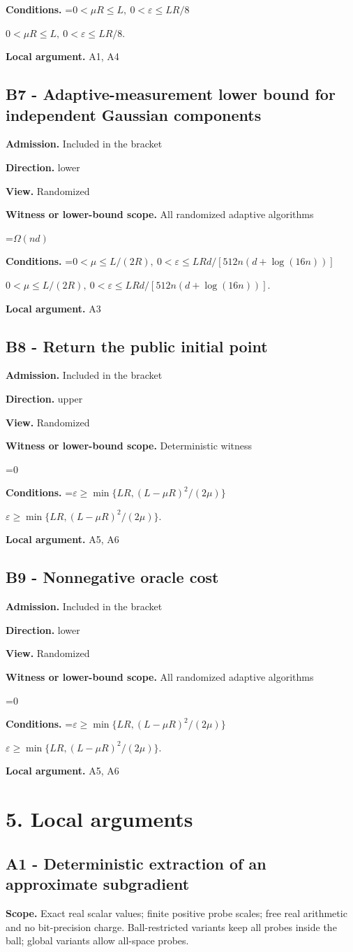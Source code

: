 \documentclass[10pt,a4paper]{article}
\newcommand{\AtlasMath}[1]{\par\begingroup\centering\setbox0=\hbox{$\displaystyle #1$}\ifdim\wd0>1.4\linewidth\typeout{ATLAS WIDE FORMULA: \the\wd0}\fi\ifdim\wd0>\linewidth\resizebox{\linewidth}{!}{\box0}\else\box0\fi\par\endgroup}
\newcommand{\AtlasInlineMath}[1]{\begingroup\setbox0=\hbox{$#1$}\ifdim\wd0>.4\linewidth\endgroup\AtlasMath{#1}\else\endgroup$#1$\fi}
\begin{document}
\textbf{Conditions.} \AtlasInlineMath{0<\mu R\le L,\ 0<\varepsilon\le LR/8}.

\textbf{Local argument.} A1, A4

\subsection{B7 - Adaptive-measurement lower bound for independent Gaussian components}
\textbf{Admission.} Included in the bracket

\textbf{Direction.} lower

\textbf{View.} Randomized

\textbf{Witness or lower-bound scope.} All randomized adaptive algorithms

\AtlasMath{\Omega(nd)}
\textbf{Conditions.} \AtlasInlineMath{0<\mu\le L/(2R),\ 0<\varepsilon\le LRd/[512n(d+\log(16n))]}.

\textbf{Local argument.} A3

\subsection{B8 - Return the public initial point}
\textbf{Admission.} Included in the bracket

\textbf{Direction.} upper

\textbf{View.} Randomized

\textbf{Witness or lower-bound scope.} Deterministic witness

\AtlasMath{0}
\textbf{Conditions.} \AtlasInlineMath{\varepsilon\ge\min\{LR,(L-\mu R)^2/(2\mu)\}}.

\textbf{Local argument.} A5, A6

\subsection{B9 - Nonnegative oracle cost}
\textbf{Admission.} Included in the bracket

\textbf{Direction.} lower

\textbf{View.} Randomized

\textbf{Witness or lower-bound scope.} All randomized adaptive algorithms

\AtlasMath{0}
\textbf{Conditions.} \AtlasInlineMath{\varepsilon\ge\min\{LR,(L-\mu R)^2/(2\mu)\}}.

\textbf{Local argument.} A5, A6

\section{5. Local arguments}
\subsection{A1 - Deterministic extraction of an approximate subgradient}
\textbf{Scope.} Exact real scalar values; finite positive probe scales; free real arithmetic and no bit-precision charge. Ball-restricted variants keep all probes inside the ball; global variants allow all-space probes.
\end{document}
